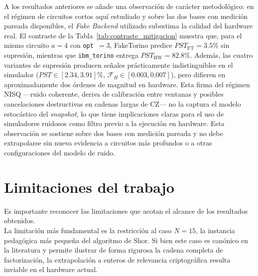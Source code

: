 \documentclass[12pt, spanish]{book}
\begin{document}
A los resultados anteriores se añade una observación de carácter metodológico: en el régimen de circuitos cortos aquí estudiado y sobre las dos bases con medición pareada disponibles, el \textit{Fake Backend} utilizado subestima la calidad del hardware real. El contraste de la Tabla~\ref{tab:contraste_mitigacion} muestra que, para el mismo circuito $a = 4$ con \texttt{opt}~$=3$, FakeTorino predice $PST_{\text{FT}} = 3.5\%$ sin supresión, mientras que \texttt{ibm\_torino} entrega $PST_{\text{HW}} = 82.8\%$. Además, las cuatro variantes de supresión producen señales prácticamente indistinguibles en el simulador ($PST \in [2.34, 3.91]\%$, $\mathcal{F}_H \in [0.003, 0.007]$), pero difieren en aproximadamente dos órdenes de magnitud en hardware. Esta firma del régimen NISQ ---ruido coherente, deriva de calibración entre ventanas y posibles cancelaciones destructivas en cadenas largas de CZ--- no la captura el modelo estocástico del \textit{snapshot}, lo que tiene implicaciones claras para el uso de simuladores ruidosos como filtro previo a la ejecución en hardware. Esta observación se sostiene sobre dos bases con medición pareada y no debe extrapolarse sin nueva evidencia a circuitos más profundos o a otras configuraciones del modelo de ruido.

\section{Limitaciones del trabajo}

Es importante reconocer las limitaciones que acotan el alcance de los resultados obtenidos.\\

La limitación más fundamental es la restricción al caso $N = 15$, la instancia pedagógica más pequeña del algoritmo de Shor. Si bien este caso es canónico en la literatura y permite ilustrar de forma rigurosa la cadena completa de factorización, la extrapolación a enteros de relevancia criptográfica resulta inviable en el hardware actual.\\
\end{document}
